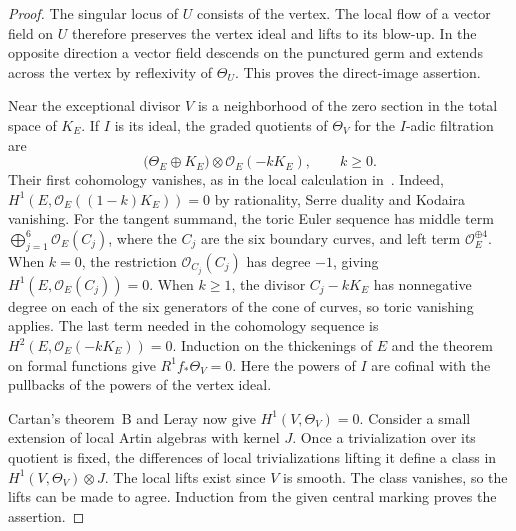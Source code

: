 \begin{proof}
The singular locus of $U$ consists of the vertex. The local flow of a
vector field on $U$ therefore preserves the vertex ideal and lifts to
its blow-up. In the opposite direction a vector field descends on the
punctured germ and extends across the vertex by reflexivity of
$\Theta_U$. This proves the direct-image assertion.

Near the exceptional divisor $V$ is a neighborhood of the zero section in
the total space of $K_E$. If $I$ is its ideal, the graded quotients of
$\Theta_V$ for the $I$-adic filtration are
\[
 \bigl(\Theta_E\oplus K_E\bigr)\otimes\mathcal O_E(-kK_E),
 \qquad k\geq 0.
\]
Their first cohomology vanishes, as in the local calculation
in~\cite[proof of Lemma~5.2, (47)--(48)]{W5}. Indeed,
$H^1(E,\mathcal O_E((1-k)K_E))=0$ by rationality, Serre duality and
Kodaira vanishing. For the tangent summand, the toric Euler sequence
has middle term $\bigoplus_{j=1}^6\mathcal O_E(C_j)$, where the $C_j$
are the six boundary curves, and left term $\mathcal O_E^{\oplus4}$.
When $k=0$, the restriction $\mathcal O_{C_j}(C_j)$ has degree $-1$,
giving $H^1(E,\mathcal O_E(C_j))=0$. When $k\geq1$, the divisor
$C_j-kK_E$ has nonnegative degree on each of the six generators of the
cone of curves, so toric vanishing applies. The last term needed in the
cohomology sequence is $H^2(E,\mathcal O_E(-kK_E))=0$.
Induction on the thickenings of $E$ and the theorem on formal functions
give $R^1f_*\Theta_V=0$. Here the powers of $I$ are cofinal with the
pullbacks of the powers of the vertex ideal.

Cartan's theorem~B and Leray now give $H^1(V,\Theta_V)=0$. Consider a
small extension of local Artin algebras with kernel $J$. Once a
trivialization over its quotient is fixed, the differences of local
trivializations lifting it define a class in
$H^1(V,\Theta_V)\otimes J$. The local lifts exist since $V$ is smooth.
The class vanishes, so the lifts can be made to agree. Induction from
the given central marking proves the assertion.
\end{proof}

